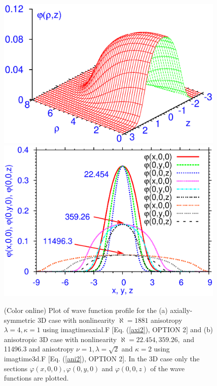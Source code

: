 \documentclass[onecolumn]{elsart3p}
\begin{document}
\begin{figure}[tbp] \begin{center}
{\includegraphics[width=.49\linewidth]{fig4a.ps}}
{\includegraphics[width=.49\linewidth]{fig4b.ps}}
\end{center}
\caption{(Color online) Plot of wave function profile for the (a)
axially-symmetric 3D case with nonlinearity $\aleph %
=1881$
anisotropy
$\lambda=4, \kappa=1$  using imagtimeaxial.F [Eq. (\ref{axi2}), OPTION
2]
and (b) anisotropic 3D case with nonlinearity $\aleph %
=22.454,
359.26,$ and 11496.3 and anisotropy $\nu=1, \lambda =\sqrt 2$ and $\kappa =2$
 using imagtime3d.F [Eq. (\ref{ani2}), OPTION 2].
In the 3D case only the sections $\varphi(x,0,0), \varphi(0,y,0)$ and
$\varphi(0,0,z)$ of the wave functions are plotted.}
\label{fig4}
\end{figure}
\end{document}
